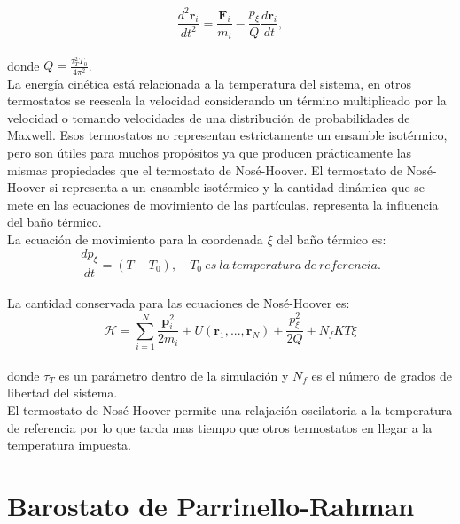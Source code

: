 \begin{equation} \label{NHmotion}
    \frac{d^2\mathbf{r}_i}{dt^2} = \frac{\mathbf{F}_i}{m_i}-\frac{p_\xi}{Q}\frac{d\mathbf{r}_i}{dt},
\end{equation}\\

\noindent donde $Q=\frac{\tau_T^2 T_0}{4\pi^2}$.\\

La energía cinética está relacionada a la temperatura del sistema, en otros termostatos se reescala la velocidad considerando un término multiplicado por la velocidad o tomando velocidades de una distribución de probabilidades de Maxwell. Esos termostatos no representan estrictamente un ensamble isotérmico, pero son útiles para muchos propósitos ya que producen prácticamente las mismas propiedades que el termostato de Nosé-Hoover. El termostato de Nosé-Hoover si representa a un ensamble isotérmico y la cantidad dinámica que se mete en las ecuaciones de movimiento de las partículas, representa la influencia del baño térmico.\\

La ecuación de movimiento para la coordenada $\xi$ del baño térmico es:\\

\begin{equation}
    \frac{dp_\xi}{dt}=(T-T_0),\quad T_0\ es\ la\ temperatura\ de\ referencia.
\end{equation}\\

La cantidad conservada para las ecuaciones de Nosé-Hoover es:\\

\begin{equation} \label{conservedNoseHoover}
    \mathcal{H} = \sum_{i=1}^{N}\frac{\mathbf{p}_i^2}{2m_i} + U(\mathbf{r}_1,...,\mathbf{r}_N)+\frac{p_\xi^2}{2Q} + N_fKT\xi
\end{equation}\\

\noindent donde $\tau_T$ es un parámetro dentro de la simulación y $N_f$ es el número de grados de libertad del sistema.\\

El termostato de Nosé-Hoover permite una relajación oscilatoria a la temperatura de referencia por lo que tarda mas tiempo que otros termostatos en llegar a la temperatura impuesta.\\

\section{Barostato de Parrinello-Rahman}

